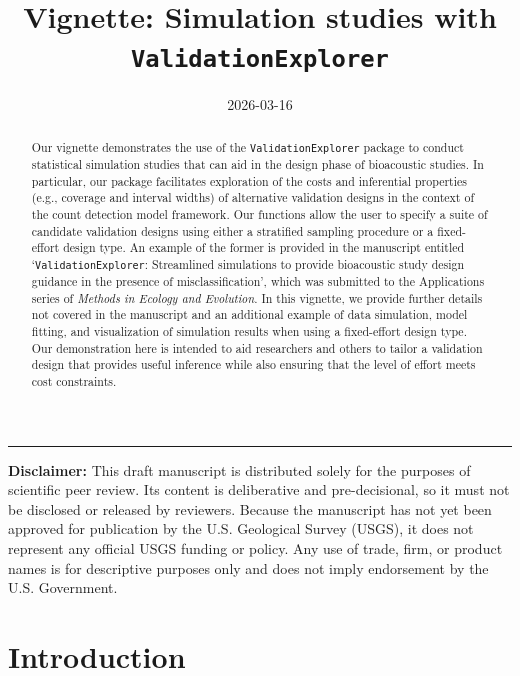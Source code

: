 \documentclass[
]{article}
\title{Vignette: Simulation studies with \texttt{ValidationExplorer}}
\author{}
\date{\vspace{-2.5em}2026-03-16}
\begin{document}
\maketitle
\begin{abstract}
Our vignette demonstrates the use of the \texttt{ValidationExplorer} package to conduct statistical simulation studies that can aid in the design phase of bioacoustic studies. In particular, our package facilitates exploration of the costs and inferential properties (e.g., coverage and interval widths) of alternative validation designs in the context of the count detection model framework. Our functions allow the user to specify a suite of candidate validation designs using either a stratified sampling procedure or a fixed-effort design type. An example of the former is provided in the manuscript entitled `\texttt{ValidationExplorer}: Streamlined simulations to provide bioacoustic study design guidance in the presence of misclassification', which was submitted to the Applications series of \emph{Methods in Ecology and Evolution}. In this vignette, we provide further details not covered in the manuscript and an additional example of data simulation, model fitting, and visualization of simulation results when using a fixed-effort design type. Our demonstration here is intended to aid researchers and others to tailor a validation design that provides useful inference while also ensuring that the level of effort meets cost constraints. \vfill
\end{abstract}

\begin{center}\rule{0.5\linewidth}{0.5pt}\end{center}

\textbf{Disclaimer:} This draft manuscript is distributed solely for the purposes of scientific peer review. Its content is deliberative and pre-decisional, so it must not be disclosed or released by reviewers. Because the manuscript has not yet been approved for publication by the U.S. Geological Survey (USGS), it does not represent any official USGS funding or policy. Any use of trade, firm, or product names is for descriptive purposes only and does not imply endorsement by the U.S. Government.

\newpage

\setcounter{tocdepth}{4}
\tableofcontents

\newpage

\doublespacing

\section{Introduction}\label{introduction}
\end{document}
